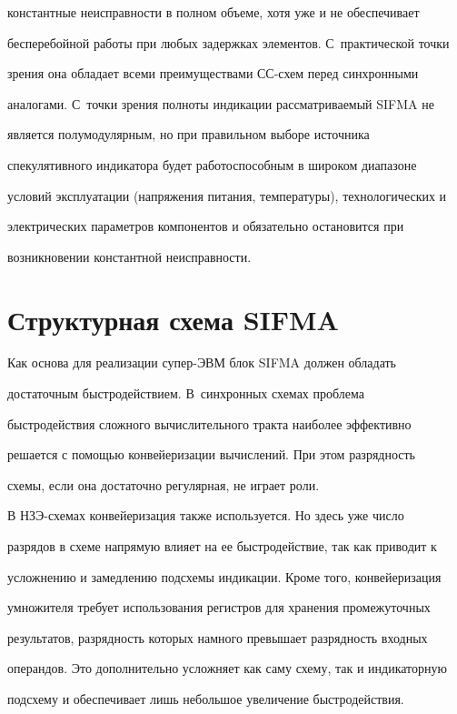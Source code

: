 константные неисправности в полном объеме, хотя уже и не обеспечивает

бесперебойной работы при любых задержках элементов. С~практической точки

зрения она обладает всеми преимуществами СС-схем перед синхронными

аналогами. С~точки зрения полноты индикации рассматриваемый SIFMA не

является полумодулярным, но при правильном выборе источника

спекулятивного индикатора будет работоспособным в широком диапазоне

условий эксплуатации (напряжения питания, температуры), технологических и

электрических параметров компонентов и обязательно остановится при

возникновении константной неисправности.



\section{Структурная схема SIFMA}



      Как основа для реализации супер-ЭВМ блок SIFMA должен обладать

достаточным быстродействием. В~синхронных схемах проблема

быстродействия сложного вычислительного тракта наиболее эффективно

решается с помощью конвейеризации вычислений. При этом разрядность

схемы, если она достаточно регулярная, не играет роли.



      В НЗЭ-схемах конвейеризация также используется. Но здесь уже число

разрядов в схеме напрямую влияет на ее быстродействие, так как приводит к

усложнению и замедлению подсхемы индикации. Кроме того, конвейеризация

умножителя требует использования регистров для хранения промежуточных

результатов, разрядность которых намного превышает разрядность входных

операндов. Это дополнительно усложняет как саму схему, так и индикаторную

подсхему и обеспечивает лишь небольшое увеличение быстродействия.

